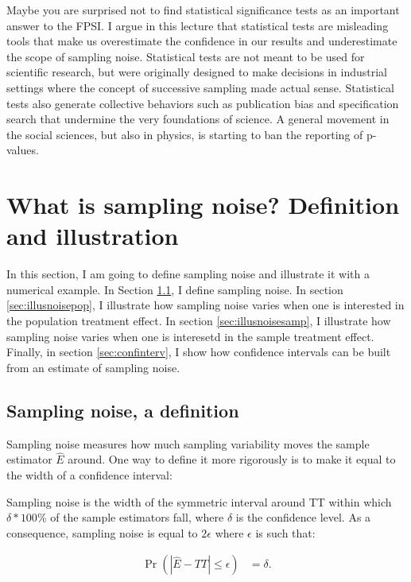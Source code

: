 \documentclass[]{book}
\theoremstyle{definition}
\theoremstyle{definition}
\theoremstyle{definition}
\theoremstyle{remark}
\let\BeginKnitrBlock\begin \let\EndKnitrBlock\end
\begin{document}
Maybe you are surprised not to find statistical significance tests as an
important answer to the FPSI. I argue in this lecture that statistical
tests are misleading tools that make us overestimate the confidence in
our results and underestimate the scope of sampling noise. Statistical
tests are not meant to be used for scientific research, but were
originally designed to make decisions in industrial settings where the
concept of successive sampling made actual sense. Statistical tests also
generate collective behaviors such as publication bias and specification
search that undermine the very foundations of science. A general
movement in the social sciences, but also in physics, is starting to ban
the reporting of p-values.

\section{What is sampling noise? Definition and
illustration}\label{sec:sampnoise}

In this section, I am going to define sampling noise and illustrate it
with a numerical example. In Section \ref{sec:definitionnoise}, I define
sampling noise. In section \ref{sec:illusnoisepop}, I illustrate how
sampling noise varies when one is interested in the population treatment
effect. In section \ref{sec:illusnoisesamp}, I illustrate how sampling
noise varies when one is interesetd in the sample treatment effect.
Finally, in section \ref{sec:confinterv}, I show how confidence
intervals can be built from an estimate of sampling noise.

\subsection{Sampling noise, a definition}\label{sec:definitionnoise}

Sampling noise measures how much sampling variability moves the sample
estimator \(\hat{E}\) around. One way to define it more rigorously is to
make it equal to the width of a confidence interval:

\BeginKnitrBlock{definition}[Sampling noise]
\protect\hypertarget{def:sampnoise}{}{\label{def:sampnoise}
\iffalse (Sampling noise) \fi{} }Sampling noise is the width of the
symmetric interval around TT within which \(\delta*100\)\% of the sample
estimators fall, where \(\delta\) is the confidence level. As a
consequence, sampling noise is equal to \(2\epsilon\) where \(\epsilon\)
is such that:

\begin{align*}
\Pr(|\hat{E}-TT|\leq\epsilon) &= \delta.
\end{align*}
\EndKnitrBlock{definition}
\end{document}
